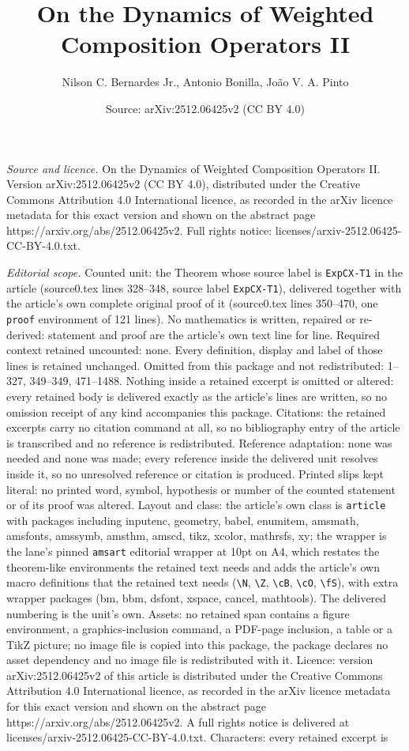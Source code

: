 \documentclass[10pt,a4paper]{amsart}
\title[On the Dynamics of Weighted Composition Operators II]{On the Dynamics of Weighted Composition Operators II}
\author{Nilson C. Bernardes Jr., Antonio Bonilla, Jo\~ao V. A. Pinto}
\date{Source: arXiv:2512.06425v2 (CC BY 4.0)}
\begin{document}
\maketitle

\noindent\emph{Source and licence.} On the Dynamics of Weighted Composition Operators II. Version arXiv:2512.06425v2 (CC BY 4.0), distributed under the Creative Commons Attribution 4.0 International licence, as recorded in the arXiv licence metadata for this exact version and shown on the abstract page https://arxiv.org/abs/2512.06425v2. Full rights notice: licenses/arxiv-2512.06425-CC-BY-4.0.txt.\par\smallskip

\noindent\textit{Editorial scope.} Counted unit: the Theorem whose source label is \texttt{ExpCX-T1} in the article (source0.tex lines 328--348, source label \texttt{ExpCX-T1}), delivered together with the article's own complete original proof of it (source0.tex lines 350--470, one \texttt{proof} environment of 121 lines). No mathematics is written, repaired or re-derived: statement and proof are the article's own text line for line. Required context retained uncounted: none. Every definition, display and label of those lines is retained unchanged. Omitted from this package and not redistributed: 1--327, 349--349, 471--1488. Nothing inside a retained excerpt is omitted or altered: every retained body is delivered exactly as the article's lines are written, so no omission receipt of any kind accompanies this package. Citations: the retained excerpts carry no citation command at all, so no bibliography entry of the article is transcribed and no reference is redistributed. Reference adaptation: none was needed and none was made; every reference inside the delivered unit resolves inside it, so no unresolved reference or citation is produced. Printed slips kept literal: no printed word, symbol, hypothesis or number of the counted statement or of its proof was altered. Layout and class: the article's own class is \texttt{article} with packages including inputenc, geometry, babel, enumitem, amsmath, amsfonts, amssymb, amsthm, amscd, tikz, xcolor, mathrsfs, xy; the wrapper is the lane's pinned \texttt{amsart} editorial wrapper at 10pt on A4, which restates the theorem-like environments the retained text needs and adds the article's own macro definitions that the retained text needs (\texttt{\textbackslash N}, \texttt{\textbackslash Z}, \texttt{\textbackslash cB}, \texttt{\textbackslash cO}, \texttt{\textbackslash fS}), with extra wrapper packages (bm, bbm, dsfont, xspace, cancel, mathtools). The delivered numbering is the unit's own. Assets: no retained span contains a figure environment, a graphics-inclusion command, a PDF-page inclusion, a table or a TikZ picture; no image file is copied into this package, the package declares no asset dependency and no image file is redistributed with it. Licence: version arXiv:2512.06425v2 of this article is distributed under the Creative Commons Attribution 4.0 International licence, as recorded in the arXiv licence metadata for this exact version and shown on the abstract page https://arxiv.org/abs/2512.06425v2. A full rights notice is delivered at licenses/arxiv-2512.06425-CC-BY-4.0.txt. Characters: every retained excerpt is 
\end{document}
